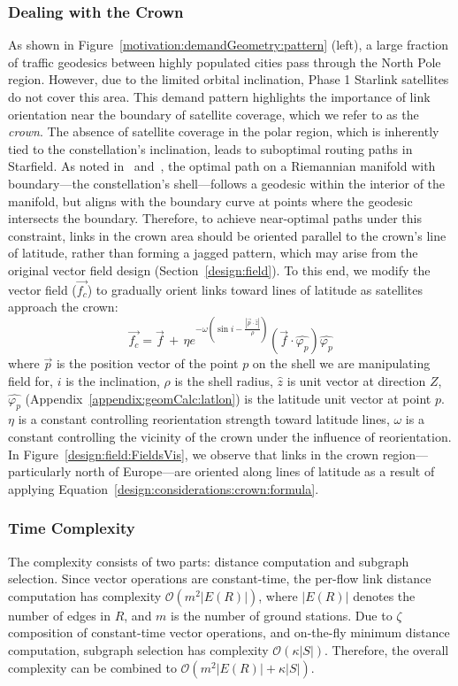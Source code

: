 \documentclass[acmsmall, screen]{acmart}
\begin{document}
\subsubsection{Dealing with the Crown}\label{design:consideration:crown}
As shown in Figure~\ref{motivation:demandGeometry:pattern} (left), a large fraction of traffic geodesics between highly populated cities pass through the North Pole region. However, due to the limited orbital inclination, Phase 1 Starlink satellites do not cover this area. This demand pattern highlights the importance of link orientation near the boundary of satellite coverage, which we refer to as the \textit{crown}. The absence of satellite coverage in the polar region, which is inherently tied to the constellation’s inclination, leads to suboptimal routing paths in Starfield. As noted in~\cite{alexander1981geodesics} and~\cite{de2008computational}, the optimal path on a Riemannian manifold with boundary—the constellation's shell—follows a geodesic within the interior of the manifold, but aligns with the boundary curve at points where the geodesic intersects the boundary. Therefore, to achieve near-optimal paths under this constraint, links in the crown area should be oriented parallel to the crown's line of latitude, rather than forming a jagged pattern, which may arise from the original vector field design (Section~\ref{design:field}). To this end, we modify the vector field ($\vec{f_c}$) to gradually orient links toward lines of latitude as satellites approach the crown:
\begin{equation}\label{design:considerations:crown:formula}
    \vec{f_c} = \vec{f}\, + \, \eta e^{-\omega(\sin{i} - \frac{|\vec{p} \cdot \hat{z}|}{\rho})}(\vec{f} \cdot \hat{\varphi_p}) \hat{\varphi_p}
\end{equation}
where $\vec{p}$ is the position vector of the point $p$ on the shell we are manipulating field for, $i$ is the inclination, $\rho$ is the shell radius, $\hat{z}$ is unit vector at direction $Z$, $\hat{\varphi_p}$ (Appendix~\ref{appendix:geomCalc:latlon}) is the latitude unit vector at point $p$. $\eta$ is a constant controlling reorientation strength toward latitude lines, $\omega$ is a constant controlling the vicinity of the crown under the influence of reorientation. In Figure~\ref{design:field:FieldsVis}, we observe that links in the crown region—particularly north of Europe—are oriented along lines of latitude as a result of applying Equation~\ref{design:considerations:crown:formula}.

\subsubsection{Time Complexity}
The complexity consists of two parts: distance computation and subgraph selection. Since vector operations are constant-time, the per-flow link distance computation has complexity $\mathcal{O}(m^2|E(R)|)$, where $|E(R)|$ denotes the number of edges in $R$, and $m$ is the number of ground stations. Due to $\zeta$ composition of constant-time vector operations, and on-the-fly minimum distance computation, subgraph selection has complexity $\mathcal{O}(\kappa|S|)$. Therefore, the overall complexity can be combined to $\mathcal{O}(m^2|E(R)| + \kappa|S|)$.
\end{document}
